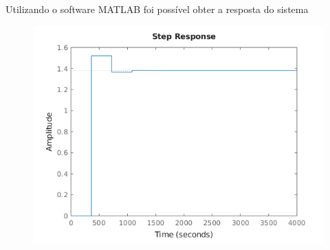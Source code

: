 \documentclass[a4paper,12pt]{article}
\begin{document}
		Utilizando o software MATLAB foi possível obter a resposta do sistema
		
		\begin{figure}[H]
			\centering
			\includegraphics[width=0.5\linewidth]{images/resp2g.png}
			\label{fig:resposta_e}
		\end{figure}
		
				

			
			
			
			
			
			
		
		
		
		
		
		
		
		
		
		
		
	
	
\end{document}
